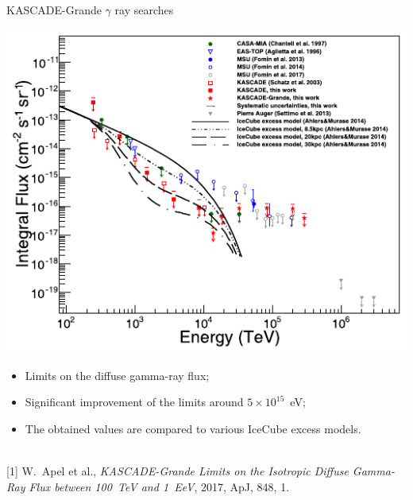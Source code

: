 \begin{frame}{KASCADE-Grande $\gamma$ ray searches}
\begin{minipage}[c]{0.59\textwidth}
  \includegraphics[width=1\textwidth]{pics/KASCADE-Grande_UHECR2016-2.pdf}
\end{minipage}\hfill
\begin{minipage}[c]{0.4\textwidth}
\begin{itemize}
 \item Limits on the diffuse gamma-ray flux;
 \item Significant improvement of the limits around $5 \times 10^{15}$~eV;
 \item The obtained values are compared to various IceCube excess models.
\end{itemize}
\end{minipage}

\hrulefill\\
\small
[1] W.~Apel et al., \textit{KASCADE-Grande Limits on the Isotropic Diffuse Gamma-Ray Flux between 100~TeV and 1~EeV}, 2017, ApJ, 848, 1.
\end{frame}

